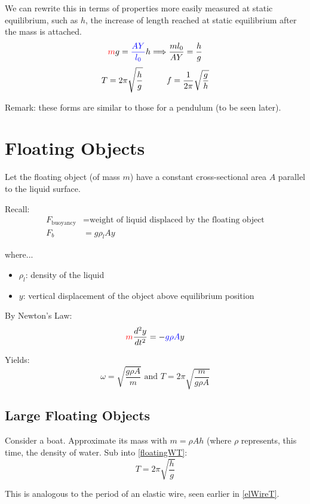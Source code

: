 \documentclass[11pt,letterpaper,titlepage,oneside]{book}
\newcommand{\htab}{\hspace{0.5cm}}
\begin{document}
We can rewrite this in terms of properties more easily measured at static equilibrium, such as $h$, the increase of length reached at static equilibrium after the mass is attached.
\[ \textcolor{red}{m}g=\textcolor{blue}{\frac{AY}{l_0}} h \Longrightarrow \frac{ml_0}{AY}=\frac{h}{g} \]
\begin{equation}
T=2\pi\sqrt{\frac{h}{g}} \htab\htab
f=\frac{1}{2\pi} \sqrt{\frac{g}{h}}
 \label{elWireT}
\end{equation} 

Remark: these forms are similar to those for a pendulum (to be seen later).

\section{Floating Objects}
Let the floating object (of mass $m$) have a constant cross-sectional area $A$ parallel to the liquid surface.

Recall:
\begin{align*}
	 F_\text{buoyancy} &= \text{weight of liquid displaced by the floating object} \\
	 F_b & = g\rho_l Ay
\end{align*}

where...
\begin{itemize}
	\item $\rho_l$: density of the liquid
	\item $y$: vertical displacement of the object above equilibrium position
\end{itemize}


By Newton's Law:
\[ \textcolor{red}{m}\frac{d^2y}{dt^2} = -\textcolor{blue}{g\rho A}y \]

Yields: \begin{equation} \omega = \sqrt{\frac{g\rho A}{m}} \text{ and } T = 2\pi\sqrt{\frac{m}{g\rho A}} \label{floatingWT} \end{equation}

\subsection{Large Floating Objects}
Consider a boat. Approximate its mass with $ m = \rho Ah$ (where $\rho$ represents, this time, the density of water. Sub into \eqref{floatingWT}:
\begin{equation} T = 2\pi\sqrt{\frac{h}{g}} \end{equation}

This is analogous to the period of an elastic wire, seen earlier in \eqref{elWireT}. 
\end{document}
